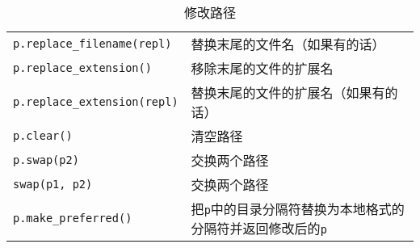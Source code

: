 \begin{table}[htb]
\begin{tabular}{l|l}
        \texttt{p.replace\_filename(repl)}  & 替换末尾的文件名（如果有的话）                                        \\
        \texttt{p.replace\_extension()}     & 移除末尾的文件的扩展名                                            \\
        \texttt{p.replace\_extension(repl)} & 替换末尾的文件的扩展名（如果有的话）                                     \\
        \texttt{p.clear()}                  & 清空路径                                                   \\
        \texttt{p.swap(p2)}                 & 交换两个路径                                                 \\
        \texttt{swap(p1, p2)}               & 交换两个路径                                                 \\
        \texttt{p.make\_preferred()}        & 把\texttt{p}中的目录分隔符替换为本地格式的分隔符并返回修改后的\texttt{p}         \\
        \hline
    \end{tabular}
    \caption{修改路径}
    \label{t20.7}
\end{table}

